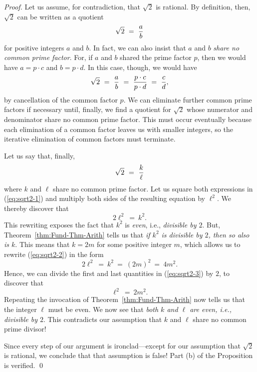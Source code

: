 \begin{proof}
Let us assume, for contradiction, that $\sqrt{2}$ is rational.  By
definition, then, $\sqrt{2}$ can be written as a quotient
\[ \sqrt{2} \ = \ {a \over b} \]
for positive integers $a$ and $b$.  In fact, we can also insist that
$a$ and $b$ {\em share no common prime factor}.  For, if $a$ and $b$
shared the prime factor $p$, then we would have $a = p \cdot c$ and
$b = p \cdot d$.  In this case, though, we would have
\[ \sqrt{2} \ = \ {a \over b} \ = \ \frac{p \cdot c}{p \cdot d}
\ = \ {c \over d},
\]
by cancellation of the common factor $p$.  We can eliminate further
common prime factors if necessary until, finally, we find a quotient
for $\sqrt{2}$ whose numerator and denominator share no common prime
factor.  This must occur eventually because each elimination of a
common factor leaves us with smaller integers, so the iterative
elimination of common factors must terminate.

Let us say that, finally,
\begin{equation}
\label{eq:sqrt2-1}
\sqrt{2} \ = \ {k \over \ell}
\end{equation}
where $k$ and $\ell$ share no common prime factor.  Let us square both
expressions in (\ref{eq:sqrt2-1}) and multiply both sides of the
resulting equation by $\ell^2$.  We thereby discover that
\begin{equation}
\label{eq:sqrt2-2}
2 \ell^2 \ = \ k^2.
\end{equation}
This rewriting exposes the fact that $k^2$ is {\em even},
i.e., {\em divisible by $2$}.  But, Theorem~\ref{thm:Fund-Thm-Arith}
tells us that {\em if $k^2$ is divisible by $2$, then so also is $k$}.
This means that $k = 2m$ for some positive integer $m$, which allows
us to rewrite (\ref{eq:sqrt2-2}) in the form
\begin{equation}
\label{eq:sqrt2-3}
2 \ell^2 \ = \ k^2 \ = \ (2m)^2 \ = \ 4m^2.
\end{equation}
Hence, we can divide the first and last quantities in
(\ref{eq:sqrt2-3}) by $2$, to discover that
\[ \ell^2 \ = \ 2m^2. \]
Repeating the invocation of Theorem~\ref{thm:Fund-Thm-Arith} now tells
us that the integer $\ell$ must be even.  We now see that {\em both
  $k$ and $\ell$ are even, i.e., divisible by $2$}.  This contradicts
our assumption that $k$ and $\ell$ share no common prime divisor!

Since every step of our argument is ironclad---except for our
assumption that $\sqrt{2}$ is rational, we conclude that that
assumption is false!  Part (b) of the Proposition is verified. \qed
\end{proof}


